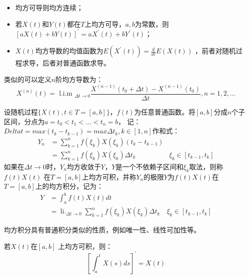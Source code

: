 \begin{property}
  \begin{itemize}
    \item[1.]  均方可导则均方连续；
    \item[2.]  若$X(t)$和$Y(t)$都在$T$上均方可导，$a, b$为常数，则$[a X(t)+b Y(t)]^{\prime}=a X^{\prime}(t)+b Y^{\prime}(t)$；
    \item[3.]  $X(t)$均方导数的均值函数为$E(X^{\prime}(t))=\frac{d}{dt}E(X(t))$ ，前者对随机过程求导，后者对普通函数求导。
  \end{itemize}
\end{property}
类似的可以定义$n$阶均方导数为：
\begin{equation}
  X^{(n)}(t)=\text { l.i.m }_{\Delta t \rightarrow 0} \frac{X^{(n-1)}\left(t_0+\Delta t\right)-X^{(n-1)}\left(t_0\right)}{\Delta t}, n=1,2, \ldots
  \end{equation}

\begin{definition}
  设随机过程$\{X(t), t \in T =[a, b] \}$，$f(t)$为任意普通函数。将$[a, b]$分成$n$个子区间，分点为$a=t_0 < t_1 < ... < t_n = b$，
  记：
  $Delta t = max(t_k - t_{k-1}) = max \Delta t_k, k \in [1, n]$作和式：
  \begin{equation}
    \begin{array}{rlr}
    Y_n & =\sum_{k=1}^n f\left(\xi_k\right) X\left(\xi_k\right)\left(t_k-t_{k-1}\right) & \\
    & =\sum_{k=1}^n f\left(\xi_k\right) X\left(\xi_k\right) \Delta t_k & \xi_k \in\left[t_{k-1}, t_k\right]
    \end{array}
  \end{equation}
如果在$\Delta t \rightarrow 0$时，$Y_n$均方收敛于$Y$，$Y$是一个不依赖子区间和$\xi_k$取法，则称$f(t)X(t)$
在$T=[a, b]$上均方可积，并称$Y_n$的极限$Y$为$f(t)X(t)$在$T=[a, b]$上的均方积分，记为：
\begin{equation}
  \begin{aligned}
  Y & =\int_a^b f(t) X(t) d t \\
  & =\operatorname{li.}_{\Delta t \rightarrow 0} \sum_{k=1}^n f\left(\xi_k\right) X\left(\xi_k\right) \Delta t_k \quad \xi_k \in\left[t_{k-1}, t_k\right]
  \end{aligned}
  \end{equation}
\end{definition}
均方积分具有普通积分类似的性质，例如唯一性、线性可加性等。

\begin{theorem}
  若$X(t)$在$[a, b]$ 上均方可积，则：
  \begin{equation}
    \left[\int_a^t X(s) d s\right]^{\prime}=X(t)
  \end{equation}
\end{theorem}

